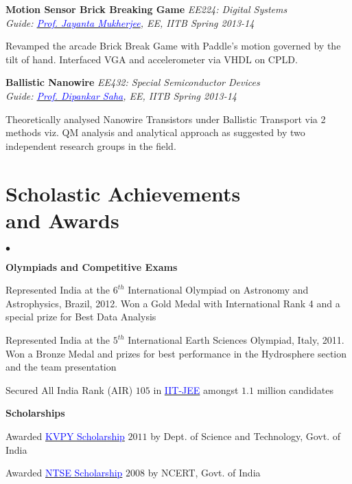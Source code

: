 \documentclass[margin,line]{res}
\newenvironment{list1}{
  \begin{list}{\ding{113}}{%
      \setlength{\itemsep}{0in}
      \setlength{\parsep}{0in} \setlength{\parskip}{0in}
      \setlength{\topsep}{0in} \setlength{\partopsep}{0in} 
      \setlength{\leftmargin}{0.17in}}}{\end{list}}
\newenvironment{list2}{
  \begin{list}{$\bullet$}{%
      \setlength{\itemsep}{0in}
      \setlength{\parsep}{0in} \setlength{\parskip}{0in}
      \setlength{\topsep}{0in} \setlength{\partopsep}{0in} 
      \setlength{\leftmargin}{0.2in}}}{\end{list}}
\begin{document}
\begin{resume}
{\bf Motion Sensor Brick Breaking Game} \hfill \textit{EE224: Digital Systems}\\
{\em Guide: \href{https://www.ee.iitb.ac.in/wiki/faculty/jayanta}{\textcolor{blue}{Prof. Jayanta Mukherjee}}, EE, IITB \hfill Spring 2013-14}\\
\vspace*{-.15in}
\begin{list1}
\item[]Revamped the arcade Brick Break Game with Paddle’s motion governed by the tilt of hand. Interfaced VGA and accelerometer via VHDL on CPLD. 
\end{list1}

\vspace*{-0.1in}

{\bf Ballistic Nanowire} \hfill \textit{EE432: Special Semiconductor Devices}\\
{\em Guide: \href{https://www.ee.iitb.ac.in/wiki/faculty/dsaha}{\textcolor{blue}{Prof. Dipankar Saha}}, EE, IITB \hfill Spring 2013-14}\\
\vspace*{-.15in}
\begin{list1}
\item[]Theoretically analysed Nanowire Transistors under Ballistic Transport via 2 methods viz. QM analysis and analytical approach as suggested by two independent research groups in the field.
\end{list1}

\section{\sc Scholastic Achievements \\and Awards}
\begin{list2}
\item[\strut\hspace{0.5cm}\textbf{Olympiads and Competitive Exams}]
\item Represented India at the $6^{th}$ International Olympiad on Astronomy and Astrophysics, Brazil, 2012. Won a Gold Medal with International Rank 4 and a special prize for Best Data Analysis
\item Represented India at the $5^{th}$ International Earth Sciences Olympiad, Italy, 2011. Won a Bronze Medal and prizes for best performance in the Hydrosphere section and the team presentation
\item  Secured All India Rank (AIR) $105$ in \href{https://en.wikipedia.org/wiki/Indian_Institute_of_Technology_Joint_Entrance_Examination}{\textcolor{blue}{IIT-JEE}} amongst $1.1$ million candidates
\vspace{0.05in}
\item[\strut\hspace{0.5cm}\textbf{Scholarships}]
\item Awarded \href{http://www.kvpy.iisc.ernet.in/main/index.htm}{\textcolor{blue}{KVPY Scholarship}} $2011$ by Dept. of Science and Technology, Govt. of India
\item Awarded \href{http://www.ncert.nic.in/programmes/talent_exam/index_talent.html}{\textcolor{blue}{NTSE Scholarship}} $2008$ by NCERT, Govt. of India
\end{list2}



\end{resume}
\end{document}
